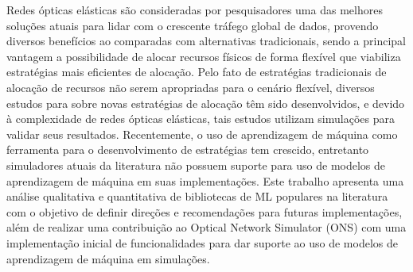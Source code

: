 Redes ópticas elásticas são consideradas por pesquisadores uma das melhores soluções atuais para lidar com o crescente tráfego global de dados, provendo diversos benefícios ao comparadas com alternativas tradicionais, sendo a principal vantagem a possibilidade de alocar recursos físicos de forma flexível que viabiliza estratégias mais eficientes de alocação. Pelo fato de estratégias tradicionais de alocação de recursos não serem apropriadas para o cenário flexível, diversos estudos para sobre novas estratégias de alocação têm sido desenvolvidos, e devido à complexidade de redes ópticas elásticas, tais estudos utilizam simulações para validar seus resultados. Recentemente, o uso de aprendizagem de máquina como ferramenta para o desenvolvimento de estratégias tem crescido, entretanto simuladores atuais da literatura não possuem suporte para uso de modelos de aprendizagem de máquina em suas implementações. Este trabalho apresenta uma análise qualitativa e quantitativa de bibliotecas de ML populares na literatura com o objetivo de definir direções e recomendações para futuras implementações, além de realizar uma contribuição ao Optical Network Simulator (ONS) com uma implementação inicial de funcionalidades para dar suporte ao uso de modelos de aprendizagem de máquina em simulações.